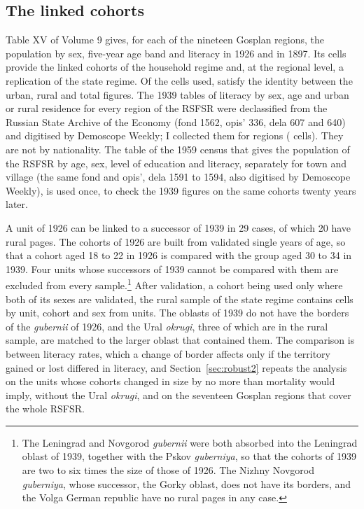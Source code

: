 \subsection{The linked cohorts}

Table XV of Volume 9 gives, for each of the nineteen Gosplan regions, the population by sex, five-year age band and literacy in 1926 and in 1897. Its  cells provide the linked cohorts of the household regime and, at the regional level, a replication of the state regime. Of the  cells used,  satisfy the identity between the urban, rural and total figures. The 1939 tables of literacy by sex, age and urban or rural residence for every region of the RSFSR were declassified from the Russian State Archive of the Economy (fond 1562, opis' 336, dela 607 and 640) and digitised by Demoscope Weekly; I collected them for  regions ( cells). They are not by nationality. The table of the 1959 census that gives the population of the RSFSR by age, sex, level of education and literacy, separately for town and village (the same fond and opis', dela 1591 to 1594, also digitised by Demoscope Weekly), is used once, to check the 1939 figures on the same cohorts twenty years later.

A unit of 1926 can be linked to a successor of 1939 in 29 cases, of which 20 have rural pages. The cohorts of 1926 are built from validated single years of age, so that a cohort aged 18 to 22 in 1926 is compared with the group aged 30 to 34 in 1939. Four units whose successors of 1939 cannot be compared with them are excluded from every sample.\footnote{The Leningrad and Novgorod \emph{gubernii} were both absorbed into the Leningrad oblast of 1939, together with the Pskov \emph{guberniya}, so that the cohorts of 1939 are two to six times the size of those of 1926. The Nizhny Novgorod \emph{guberniya}, whose successor, the Gorky oblast, does not have its borders, and the Volga German republic have no rural pages in any case.} After validation, a cohort being used only where both of its sexes are validated, the rural sample of the state regime contains  cells by unit, cohort and sex from  units. The oblasts of 1939 do not have the borders of the \emph{gubernii} of 1926, and the Ural \emph{okrugi}, three of which are in the rural sample, are matched to the larger oblast that contained them. The comparison is between literacy rates, which a change of border affects only if the territory gained or lost differed in literacy, and Section~\ref{sec:robust2} repeats the analysis on the units whose cohorts changed in size by no more than mortality would imply, without the Ural \emph{okrugi}, and on the seventeen Gosplan regions that cover the whole RSFSR.

